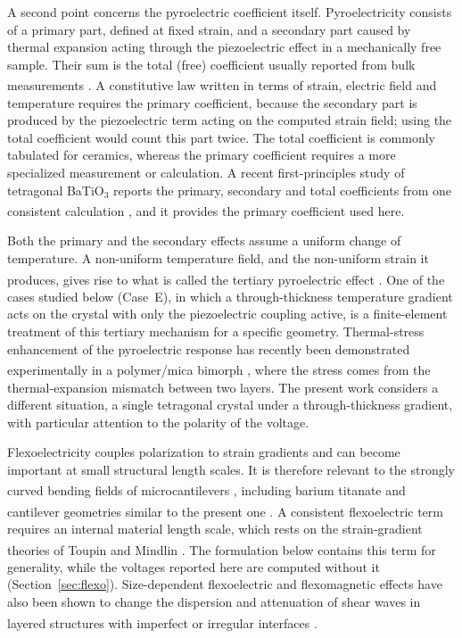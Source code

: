 \documentclass[a4paper, 11pt, twoside]{article}
\newcommand{\supercite}[1]{\!\!\textsuperscript{\cite{#1}}}
\begin{document}
A second point concerns the pyroelectric coefficient itself. Pyroelectricity consists
of a primary part, defined at fixed strain, and a secondary part caused by thermal
expansion acting through the piezoelectric effect in a mechanically free sample. Their
sum is the total (free) coefficient usually reported from bulk measurements
\supercite{Lang2005Pyro,Tagantsev1991,Lubomirsky2012}. A constitutive law written in terms
of strain, electric field and temperature requires the primary coefficient, because the
secondary part is produced by the piezoelectric term acting on the computed strain
field; using the total coefficient would count this part twice. The total coefficient
is commonly tabulated for ceramics, whereas the primary coefficient requires a more
specialized measurement or calculation. A recent first-principles study of tetragonal
BaTiO$_3$ reports the primary, secondary and total coefficients from one consistent
calculation \supercite{EklundKarttunen2023}, and it provides the primary coefficient used here.

Both the primary and the secondary effects assume a uniform change of temperature. A
non-uniform temperature field, and the non-uniform strain it produces, gives rise to
what is called the tertiary pyroelectric effect \supercite{Lang2005Pyro}. One of the cases
studied below (Case~E), in which a through-thickness temperature gradient acts on the
crystal with only the piezoelectric coupling active, is a finite-element treatment of
this tertiary mechanism for a specific geometry. Thermal-stress enhancement of the
pyroelectric response has recently been demonstrated experimentally in a polymer/mica
bimorph \supercite{Su2026ThermalStressPyro}, where the stress comes from the
thermal-expansion mismatch between two layers. The present work considers a different
situation, a single tetragonal crystal under a through-thickness gradient, with
particular attention to the polarity of the voltage.

Flexoelectricity couples polarization to strain gradients and can become important
at small structural length scales. It is therefore
relevant to the strongly curved bending fields of microcantilevers
\supercite{Tagantsev1986,Cross2006,Zubko2013}, including barium titanate \supercite{MaCross2006}
and cantilever geometries similar to the present one
\supercite{Huang2007,Mao2016,Abdollahi2014}. A consistent flexoelectric term requires an
internal material length scale, which rests on the strain-gradient theories of Toupin
and Mindlin \supercite{Toupin1962,Mindlin1964,MindlinEshel1968}. The formulation below
contains this term for generality, while the voltages reported here are computed
without it (Section~\ref{sec:flexo}). Size-dependent flexoelectric and flexomagnetic
effects have also been shown to change the dispersion and attenuation of shear waves in
layered structures with imperfect or irregular interfaces
\supercite{Meghana2025,Gupta2026AMM}.
\end{document}
